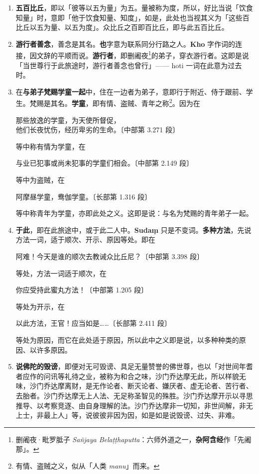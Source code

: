 \begin{enumerate}
\item \textbf{五百比丘}，即以「彼等以五为量」为五。量被称为度，所以，好比当说「饮食知量」时，意即「他于饮食知量、知度」，如是，此处也当视其义为「这些百比丘以五为量、以五为度」。众比丘之百即百比丘，即与此五百比丘。
\item \textbf{游行者善念}，善念是其名。\textbf{也}字意为联系同分行路之人。\textbf{Kho} 字作词的连接，因文辞的平顺而说。\textbf{游行者}，即删阇夜\footnote{删阇夜·毗罗胝子 \textit{Sañjaya Belaṭṭhaputta}：六师外道之一，\textbf{杂阿含经}作「先阇那」。}的弟子，穿衣游行者。这即是说「当世尊行于此旅途时，游行者善念也曾行」—— hoti 一词在此意为过去时。
\item 在\textbf{与弟子梵赐学童一起}中，住在一边者为弟子，意即行于附近、侍于跟前、学生。梵赐是其名。\textbf{学童}，即有情、盗贼、青年之称\footnote{有情、盗贼之义，似从「人类 \textit{manu}」而来。}。因为在\begin{quoting}那些放逸的学童，为天使所督促，\\他们长夜忧伤，经历卑劣的生命。{\bluefootnotesize 〔中部第 3.271 段〕}\end{quoting}等中称有情为学童，在\begin{quoting}与业已犯事或尚未犯事的学童们相会。{\bluefootnotesize 〔中部第 2.149 段〕}\end{quoting}等中为盗贼，在\begin{quoting}阿摩昼学童，鸯伽学童。{\bluefootnotesize 〔长部第 1.316 段〕}\end{quoting}等中称青年为学童，亦即此处之义。这即是说：与名为梵赐的青年弟子一起。
\item \textbf{于此}，即在此旅途中，或于此二人中。\textbf{Sudaṃ} 只是不变词。\textbf{多种方法}，先说方法一词，适于顺次、开示、原因等处。即在\begin{quoting}阿难！今天是谁的顺次去教诫众比丘尼？{\bluefootnotesize 〔中部第 3.398 段〕}\end{quoting}等处，方法一词适于顺次，在\begin{quoting}你应受持此蜜丸方法！{\bluefootnotesize 〔中部第 1.205 段〕}\end{quoting}等处为开示，在\begin{quoting}以此方法，王官！应当如是……{\bluefootnotesize 〔长部第 2.411 段〕}\end{quoting}等处为原因，而它在此处适于原因，所以此中之义即是说，以多种种类的原因、以许多原因。
\item \textbf{说佛陀的毁谤}，即便对无可毁谤、具足无量赞誉的佛世尊，也以「对世间年耆者应作的问讯等礼待之业，被称为和合之味，沙门乔达摩无此，所以样貌无味，沙门乔达摩离财，是无作论者、断灭论者、嫌厌者、虚无论者、苦行者、去胎者。沙门乔达摩无上人法、无足称圣智见的殊胜。沙门乔达摩开示以寻思推导、以考察竞逐、由自身理解的法。沙门乔达摩非一切知，非世间解，非无上士，非最上人」等，说彼彼非因为因，如是如是说毁谤、过失、非难。

\end{enumerate}
